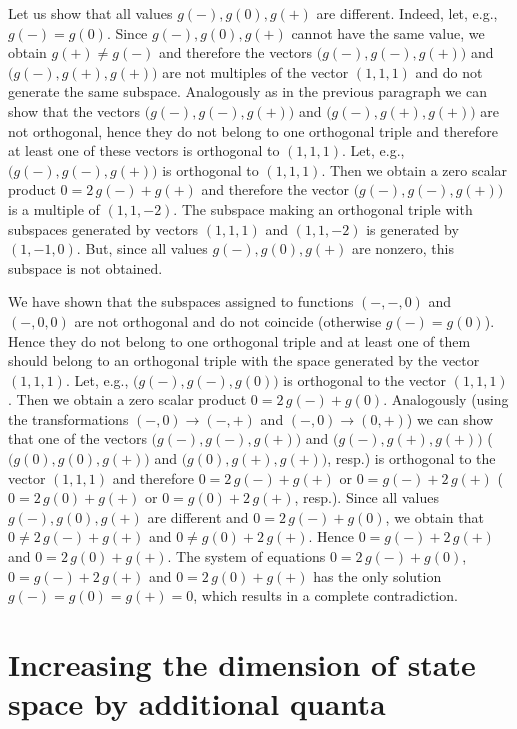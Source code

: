 \documentclass[pra,amsfonts,showpacs,showkeys,preprint]{revtex4}
\begin{document}
Let us show that all values $g(-), g(0), g(+)$ are different. Indeed, let,
e.g., $g(-) = g(0)$. Since $g(-), g(0), g(+)$ cannot have the same value, we
obtain $g(+) \neq g(-)$ and therefore the vectors $\bigl( g(-), g(-), g(+)
\bigr)$ and $\bigl( g(-), g(+), g(+) \bigr)$ are not multiples of the vector
$(1,1,1)$ and do not generate the same subspace. Analogously as in the
previous paragraph we can show that the vectors $\bigl( g(-), g(-), g(+)
\bigr)$ and $\bigl( g(-), g(+), g(+) \bigr)$ are not orthogonal, hence they
do not belong to one orthogonal triple and therefore at least one of
these vectors is orthogonal to $(1,1,1)$. Let, e.g., $\bigl( g(-), g(-),
g(+) \bigr)$ is orthogonal to $(1,1,1)$. Then we obtain a zero scalar
product $0 = 2\,g(-) + g(+)$ and therefore the vector $\bigl( g(-), g(-),
g(+) \bigr)$ is a multiple of $(1,1,-2)$. The subspace making an orthogonal
triple with subspaces generated by vectors $(1,1,1)$ and $(1,1,-2)$ is
generated by $(1,-1,0)$. But, since all values $g(-), g(0), g(+)$ are
nonzero, this subspace is not obtained.


We have shown that the subspaces assigned to functions $(-,-,0)$ and
$(-,0,0)$ are not orthogonal and do not coincide (otherwise $g(-) = g(0)$).
Hence they do not belong to one orthogonal triple and at least one of them
should belong to an orthogonal triple with the space generated by the vector
$(1,1,1)$. Let, e.g., $\bigl( g(-), g(-), g(0) \bigr)$ is orthogonal to the
vector $(1,1,1)$. Then we obtain a zero scalar product $0 = 2 \, g(-) +
g(0)$. Analogously (using the transformations $(-,0) \to (-,+)$ and $(-,0)
\to (0,+)$) we can show that one of the vectors $\bigl( g(-), g(-),
g(+)\bigr)$ and $\bigl( g(-), g(+), g(+) \bigr)$ ($\bigl( g(0), g(0), g(+)
\bigr)$ and $\bigl( g(0), g(+), g(+) \bigr)$, resp.) is orthogonal to the
vector $(1,1,1)$ and therefore $0 = 2 \, g(-) + g(+)$ or $0 = g(-) + 2 \,
g(+)$ ($0 = 2 \, g(0) + g(+)$ or $0 = g(0) + 2 \, g(+)$, resp.). Since all
values $g(-), g(0), g(+)$ are different and $0 = 2 \, g(-) + g(0)$, we
obtain that $0 \neq 2 \, g(-) + g(+)$ and $0 \neq g(0) + 2 \, g(+)$. Hence
$0 = g(-) + 2 \, g(+)$ and $0 = 2 \, g(0) + g(+)$. The system of equations
$0 = 2 \, g(-) + g(0)$, $0 = g(-) + 2 \, g(+)$ and $0 = 2 \, g(0) + g(+)$
has the only solution $g(-) = g(0) = g(+) = 0$, which results in a complete
contradiction.

\section{Increasing the dimension of state space by additional quanta}
\end{document}
